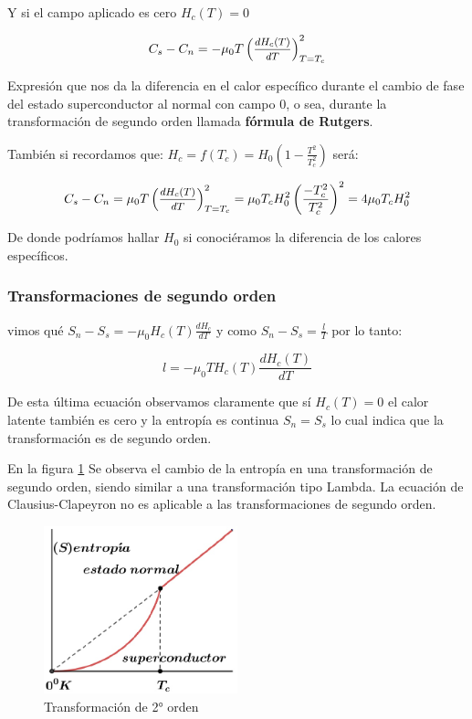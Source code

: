 Y si el campo aplicado es cero $H_{c}(T)=0$

\begin{equation}
C_{s}-C_{n}=-\mu_{0}T\left( \mfrac{dH_{c}(T)}{dT} \right)^{2}_{T=T_{c}}  
\end{equation}



Expresión que nos da la diferencia en el calor específico durante el cambio de fase del estado superconductor al normal con campo 0, o sea, durante la transformación de segundo orden llamada \textbf{fórmula de Rutgers}.

También si recordamos que: $H_{c}=f(T_{c})=H_{0}\left(1-\frac{T^{2}}{T_{c}^{2}} \right)$ será:

\begin{equation}
C_{s}-C_{n}=\mu_{0}T\left( \mfrac{dH_{c}(T)}{dT} \right)^{2}_{T=T_{c}} =
 \mu_{0}T_{c}H_{0}^{2}\left( \frac{-T_{c}^{2}}{T_{c}^{2}} \right)^{2}= 4\mu_{0}T_{c}H_{0}^{2} 
\end{equation}

De donde podríamos hallar $H_{0}$ si conociéramos la diferencia de los calores específicos.

\subsubsection{Transformaciones de segundo orden}

vimos qué $S_{n}-S_{s}= -\mu_{0}H_{c}(T)\frac{dH_{c}}{dT}$ y como $S_{n}-S_{s}=\frac{l}{T}$ por lo tanto:

\begin{equation}
l= -\mu_{0}TH_{c}(T)\frac{dH_{c}(T)}{dT} 
\end{equation}

De esta última ecuación observamos claramente que sí $H_{c}(T)=0$ el calor latente también es cero y la entropía es continua $S_{n}=S_{s}$ lo cual indica que la transformación es de segundo orden.

En la figura \ref{fig:427} Se observa el cambio de la entropía en una transformación de segundo orden, siendo similar a una transformación tipo Lambda. La ecuación de Clausius-Clapeyron no es aplicable a las transformaciones de segundo orden.

\begin{figure}[H]
    \centering
    \includegraphics[width=0.5\textwidth]{./Figures/fig427}
	\caption{Transformación de 2° orden}
	\label{fig:427}
\end{figure}

